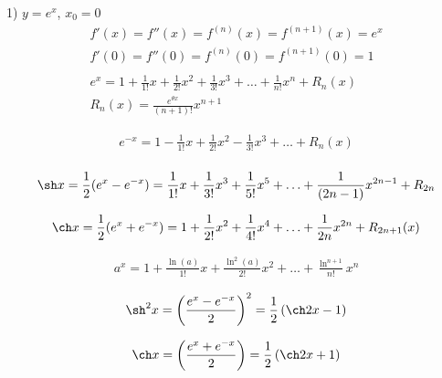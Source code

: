 1) $y=e^x$,  $x_0 = 0$
    \begin{gather*}
      f'(x) = f''(x) = f^{(n)}(x) = f^{(n+1)}(x) = e^x \\
      f'(0) = f''(0) = f^{(n)}(0) = f^{(n+1)}(0) = 1 \\
      \\
      e^x = 1 + \frac{1}{1!}x + \frac{1}{2!}x^2 + \frac{1}{3!}x^3 + \ldots + \frac{1}{n!}x^n + R_n(x) \\
      R_n(x) = \frac{e^{\theta x}}{(n+1)!}x^{n+1}
    \end{gather*}
\begin{corollary}
  \begin{gather*}
    e^{-x} = 1 - \frac{1}{1!}x + \frac{1}{2!}x^2 - \frac{1}{3!}x^3 + \ldots + R_n(x) \\
  \end{gather*}
\end{corollary}
\begin{corollary}
  \begin{gather*}
    \sh x = \frac{1}{2}(e^x - e^{-x}) = \frac{1}{1!}x + \frac{1}{3!}x^3 + \frac{1}{5!}x^5 + \ldots + \frac{1}{(2n-1)}x^{2n-1} + R_{2n}
  \end{gather*}
\end{corollary}
\begin{corollary}
  \begin{gather*}
    \ch x = \frac{1}{2}(e^x + e^{-x}) = 1 + \frac{1}{2!}x^2 + \frac{1}{4!}x^4 + \ldots + \frac{1}{2n}x^{2n} + R_{2n+1}(x)
  \end{gather*}
\end{corollary}
\begin{corollary}
  \begin{gather*}
    a^x = 1 + \frac{\ln(a)}{1!}x + \frac{\ln^2(a)}{2!} x^2 + \ldots + \frac{\ln^{n+1}}{n!} x^n
  \end{gather*}
\end{corollary}
\begin{corollary}
  \begin{gather*}
    \sh^2 x = \left( \frac{e^x - e^{-x}}{2} \right)^2 = \frac{1}{2}\left( \ch 2x - 1 \right) \\
  \end{gather*}
\end{corollary}
\begin{corollary}
  \begin{gather*}
    \ch x = \left( \frac{e^x + e^{-x}}{2} \right) = \frac{1}{2}\left( \ch 2x + 1 \right) 
  \end{gather*}
\end{corollary}

